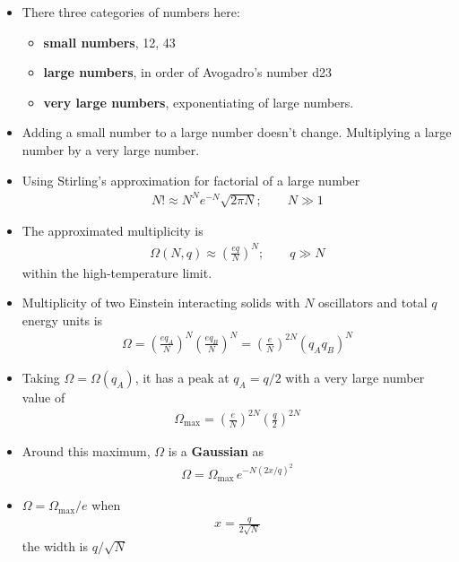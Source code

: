 \documentclass{book}
\begin{document}
\begin{itemize}
	\item There three categories of numbers here:
	      \begin{itemize}
		      \item	\textbf{small numbers}, 12, 43
		      \item	\textbf{large numbers}, in order of Avogadro's number \num{d23}
		      \item	\textbf{very large numbers}, exponentiating of large numbers.
	      \end{itemize}
	\item Adding a small number to a large number doesn't change.
	      Multiplying a large number by a very large number.
	\item Using Stirling's approximation for factorial of a large number
	      \begin{align}
		      \label{eq:Stirling}
		      N! \approx N^{N} e^{-N} \sqrt{2 \pi N} ; \qquad  N \gg 1
	      \end{align}
	\item The approximated multiplicity is
	      \begin{align}
		      \label{eq:appox omega}
		      \Omega (N, q) \approx \left( \frac{eq}{N} \right)^{N}; \qquad q \gg N
	      \end{align}
	      within the high-temperature limit.
	\item Multiplicity of two Einstein interacting solids with $N$ oscillators and total $q$ energy units is
	      \begin{align}
		      \label{eq:total multipliciy}
		      \Omega = \left( \frac{eq_{A}}{N} \right)^{N}  \left( \frac{eq_B}{N} \right)^{N}
		      = \left( \frac{e}{N} \right)^{2N} (q_A q_B)^N
	      \end{align}
	\item Taking $\Omega = \Omega(q_A)$, it has a peak at $q_A= q/2$ with a very large number value of
	      \begin{align}
		      \label{eq:Omega max}
		      \Omega_{\text{max}} = \left( \frac{e}{N} \right)^{2N} \left(\frac{q}{2} \right)^{2N}
	      \end{align}

	\item Around this maximum, $\Omega$ is a \textbf{Gaussian} as
	      \begin{align}
		      \Omega = \Omega_{\text{max}} \, e^{-N(2x/q)^2}
	      \end{align}
	\item  $\Omega = \Omega_{\text{max}}/e$ when
	      \begin{align*}
		      x = \frac{q}{2 \sqrt{N}}
	      \end{align*}
	      the width is $q/\sqrt{N}$
\end{itemize}
\end{document}
